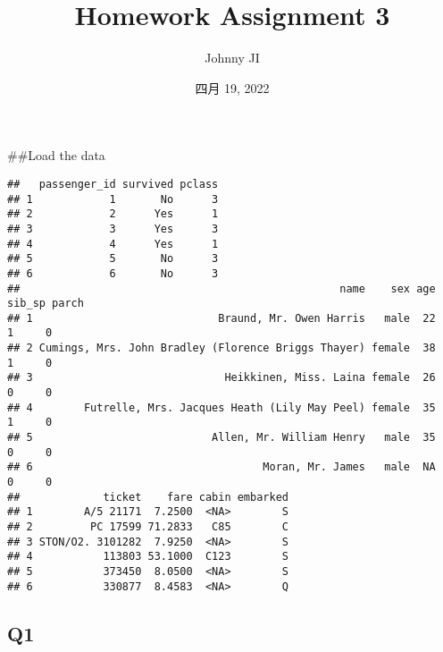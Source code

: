 \documentclass[
]{article}
\title{Homework Assignment 3}
\author{Johnny JI}
\date{四月 19, 2022}
\newenvironment{Shaded}{\begin{snugshade}}{\end{snugshade}}
\newcommand{\FunctionTok}[1]{\textcolor[rgb]{0.00,0.00,0.00}{#1}}
\newcommand{\NormalTok}[1]{#1}
\newcommand{\OtherTok}[1]{\textcolor[rgb]{0.56,0.35,0.01}{#1}}
\newcommand{\SpecialCharTok}[1]{\textcolor[rgb]{0.00,0.00,0.00}{#1}}
\newcommand{\StringTok}[1]{\textcolor[rgb]{0.31,0.60,0.02}{#1}}
\begin{document}
\maketitle

\#\#Load the data

\begin{Shaded}
\end{Shaded}

\begin{verbatim}
##   passenger_id survived pclass
## 1            1       No      3
## 2            2      Yes      1
## 3            3      Yes      3
## 4            4      Yes      1
## 5            5       No      3
## 6            6       No      3
##                                                  name    sex age sib_sp parch
## 1                             Braund, Mr. Owen Harris   male  22      1     0
## 2 Cumings, Mrs. John Bradley (Florence Briggs Thayer) female  38      1     0
## 3                              Heikkinen, Miss. Laina female  26      0     0
## 4        Futrelle, Mrs. Jacques Heath (Lily May Peel) female  35      1     0
## 5                            Allen, Mr. William Henry   male  35      0     0
## 6                                    Moran, Mr. James   male  NA      0     0
##             ticket    fare cabin embarked
## 1        A/5 21171  7.2500  <NA>        S
## 2         PC 17599 71.2833   C85        C
## 3 STON/O2. 3101282  7.9250  <NA>        S
## 4           113803 53.1000  C123        S
## 5           373450  8.0500  <NA>        S
## 6           330877  8.4583  <NA>        Q
\end{verbatim}

\hypertarget{q1}{%
\subsection{Q1}\label{q1}}
\end{document}
